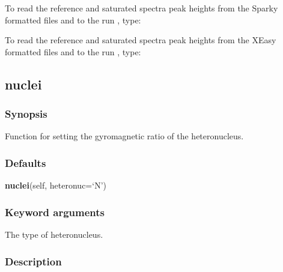 To read the reference and saturated spectra peak heights from the Sparky formatted files  and  to the run , type:




To read the reference and saturated spectra peak heights from the XEasy formatted files  and  to the run , type:






\newpage

\subsection{nuclei}


\subsubsection{Synopsis}

Function for setting the gyromagnetic ratio of the heteronucleus.



\subsubsection{Defaults}

\textsf{\textbf{nuclei}(self, heteronuc=`N')}


\subsubsection{Keyword arguments}

  The type of heteronucleus. 




\subsubsection{Description}

